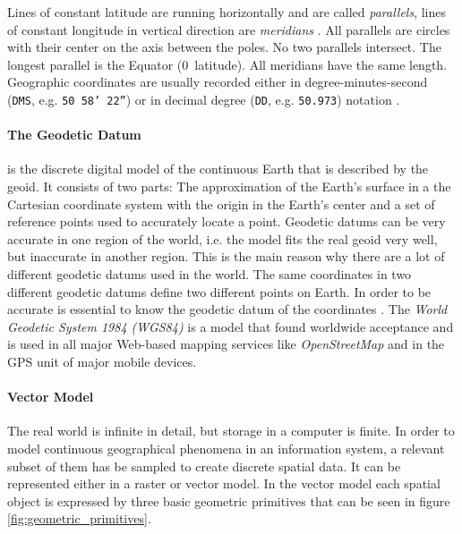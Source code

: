 Lines of constant latitude are running horizontally and are called \emph{parallels}, lines of constant longitude in vertical direction are \emph{meridians} . All parallels are circles with their center on the axis between the poles. No two parallels intersect. The longest parallel is the Equator (0\degree~latitude). All meridians have the same length. Geographic coordinates are usually recorded either in degree-minutes-second (\texttt{DMS}, e.g. \texttt{50\degree~58' 22''}) or in decimal degree (\texttt{DD}, e.g. \texttt{50.973}) notation
\cite[pp. 30, 79]{bolstad2008gis}.


\paragraph{The Geodetic Datum} %
\label{par:geodetic_datum}

is the discrete digital model of the continuous Earth that is described by the geoid. It consists of two parts: The approximation of the Earth's surface in a the Cartesian coordinate system with the origin in the Earth's center and a set of reference points used to accurately locate a point. Geodetic datums can be very accurate in one region of the world, i.e. the model fits the real geoid very well, but inaccurate in another region. This is the main reason why there are a lot of different geodetic datums used in the world. The same coordinates in two different geodetic datums define two different points on Earth. In order to be accurate is essential to know the geodetic datum of the coordinates
\cite[p. 80]{bolstad2008gis}.
The \emph{World Geodetic System 1984 (WGS84)} is a model that found worldwide acceptance and is used in all major Web-based mapping services like \emph{OpenStreetMap} and in the GPS unit of major mobile devices.


\paragraph{Vector Model} %
\label{ssub:vector_model}

The real world is infinite in detail, but storage in a computer is finite. In order to model continuous geographical phenomena in an information system, a relevant subset of them has be sampled to create discrete spatial data. It can be represented either in a raster or vector model. In the vector model each spatial object is expressed by three basic geometric primitives that can be seen in figure \ref{fig:geometric_primitives}.

